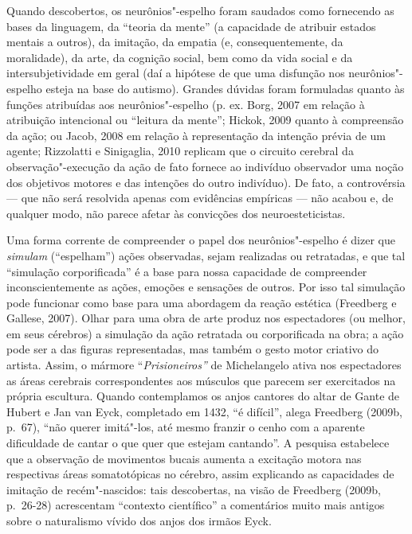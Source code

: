 Quando descobertos, os neurônios"-espelho foram saudados como fornecendo
as bases da linguagem, da ``teoria da mente'' (a capacidade de atribuir
estados mentais a outros), da imitação, da empatia (e, consequentemente,
da moralidade), da arte, da cognição social, bem como da vida social e
da intersubjetividade em geral (daí a hipótese de que uma disfunção nos
neurônios"-espelho esteja na base do autismo). Grandes dúvidas foram
formuladas quanto às funções atribuídas aos neurônios"-espelho (p. ex.
Borg, 2007 em relação à atribuição intencional ou ``leitura da mente'';
Hickok, 2009 quanto à compreensão da ação; ou Jacob, 2008 em relação à
representação da intenção prévia de um agente; Rizzolatti e Sinigaglia,
2010 replicam que o circuito cerebral da observação"-execução da ação de
fato fornece ao indivíduo observador uma noção dos objetivos motores e
das intenções do outro indivíduo). De fato, a controvérsia --- que não
será resolvida apenas com evidências empíricas --- não acabou e, de
qualquer modo, não parece afetar às convicções dos neuroesteticistas.

Uma forma corrente de compreender o papel dos neurônios"-espelho é dizer
que \emph{simulam} (``espelham'') ações observadas, sejam realizadas ou
retratadas, e que tal ``simulação corporificada'' é a base para nossa
capacidade de compreender inconscientemente as ações, emoções e
sensações de outros. Por isso tal simulação pode funcionar como base
para uma abordagem da reação estética (Freedberg e Gallese, 2007). Olhar
para uma obra de arte produz nos espectadores (ou melhor, em seus
cérebros) a simulação da ação retratada ou corporificada na obra; a ação
pode ser a das figuras representadas, mas também o gesto motor criativo
do artista. Assim, o mármore ``\emph{Prisioneiros''} de Michelangelo
ativa nos espectadores as áreas cerebrais correspondentes aos músculos
que parecem ser exercitados na própria escultura. Quando contemplamos os
anjos cantores do altar de Gante de Hubert e Jan van Eyck, completado em
1432, ``é difícil'', alega Freedberg (2009b, p.~67), ``não querer
imitá"-los, até mesmo franzir o cenho com a aparente dificuldade de
cantar o que quer que estejam cantando''. A pesquisa estabelece que a
observação de movimentos bucais aumenta a excitação motora nas
respectivas áreas somatotópicas no cérebro, assim explicando as
capacidades de imitação de recém"-nascidos: tais descobertas, na visão de
Freedberg (2009b, p.~26-28) acrescentam ``contexto científico'' a
comentários muito mais antigos sobre o naturalismo vívido dos anjos dos
irmãos Eyck.

